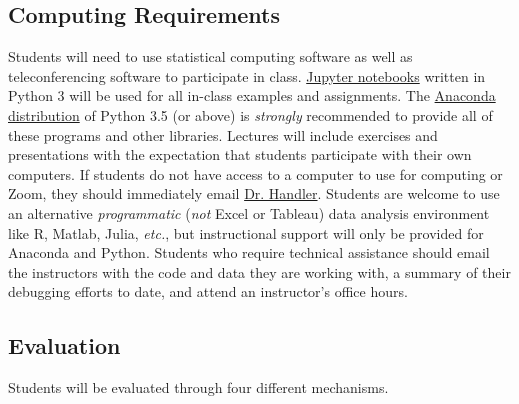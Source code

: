 \documentclass[10pt]{memoir}
\makeatletter
\def\instructorAlastname{Handler}
\def\instructorAemail{abe.handler@colorado.edu}
\makeatother
\begin{document}

\subsection{Computing Requirements}
Students will need to use statistical computing software as well as teleconferencing software to participate in class. \href{http://jupyter.org/}{Jupyter notebooks} written in Python 3 will be used for all in-class examples and assignments. The \href{https://www.continuum.io/why-anaconda}{Anaconda distribution} of Python 3.5 (or above) is \textit{strongly} recommended to provide all of these programs and other libraries. Lectures will include exercises and presentations with the expectation that students participate with their own computers. If students do not have access to a computer to use for computing or Zoom, they should immediately email \href{mailto:\instructorAemail}{Dr. \instructorAlastname}. Students are welcome to use an alternative \textit{programmatic} (\textit{not} Excel or Tableau) data analysis environment like R, Matlab, Julia, \textit{etc.}, but instructional support will only be provided for Anaconda and Python. Students who require technical assistance should email the instructors with the code and data they are working with, a summary of their debugging efforts to date, and attend an instructor's office hours.

\subsection{Evaluation} 
Students will be evaluated through four different mechanisms. 
\end{document}
